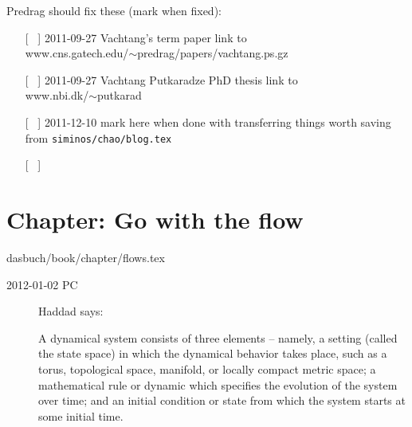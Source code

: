 Predrag should fix these (mark when fixed):
\begin{itemize}
  \item[[~]] 2011-09-27
{Vachtang's term paper} link to
\\
www.cns.gatech.edu/$\sim$predrag/papers/vachtang.ps.gz
  \item[[~]] 2011-09-27
{Vachtang Putkaradze PhD thesis} link to
\\
www.nbi.dk/$\sim$putkarad
  \item[[~]] 2011-12-10
mark here when done with transferring things worth saving from
\texttt{siminos/chao/blog.tex}
  \item[[~]]
\end{itemize}


\section{Chapter: Go with the flow}
\label{c-flows}\noindent dasbuch/book/chapter/flows.tex

\begin{description}

\item[2012-01-02 PC]
Haddad says:                     \toCB

A dynamical system consists of three elements -- namely, a setting (called
the state space) in which the dynamical behavior takes place, such as a
torus, topological space, manifold, or locally compact metric space; a
mathematical rule or dynamic which specifies the evolution of the system
over time; and an initial condition or state from which the system starts
at some initial time.

\end{description}


%
%

%
%


